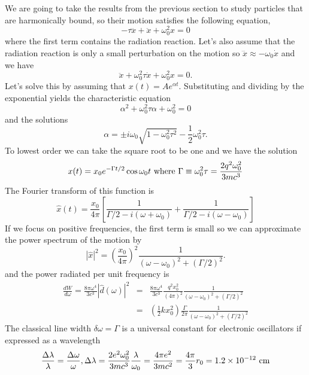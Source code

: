 We are going to take the results from the previous section to study
particles that are harmonically bound, so their motion satisfies the
following equation,
\begin{equation}
-\tau \dddot{x} + \ddot{x} + \omega_0^2 x = 0
\label{eq:245}
\end{equation}
where the first term contains the radiation reaction.  Let's also
assume that the radiation reaction is only a small perturbation on the
motion so $\dddot{x} \approx -\omega_0 \dot{x}$ and we have
\begin{equation}
\ddot{x} + \omega_0^2 \tau \dot{x} + \omega_0^2 x = 0.
\label{eq:246}
\end{equation}
Let's solve this by assuming that $x(t) = A e^{\alpha t}$.
Substituting and dividing by the exponential yields the characteristic
equation 
\begin{equation}
\alpha^2 +  \omega_0^2 \tau \alpha + \omega_0^2 = 0
\label{eq:247}
\end{equation}
and the solutions
\begin{equation}
\alpha = \pm i \omega_0 \sqrt{1 - \omega_0^2 \tau^2} - \frac{1}{2}
\omega_0^2 \tau.
\label{eq:248}
\end{equation}
To lowest order we can take the square root to be one and we have the
solution
\begin{equation}
x(t) = x_0 e^{-\Gamma t/2} \cos \omega_0 t~\hbox{\rm where}~\Gamma \equiv
\omega_0^2 \tau = \frac{2 q^2 \omega_0^2}{3mc^3}
\label{eq:249}
\end{equation}
The Fourier transform of this function is
\begin{equation}
{\hat x}(t) = \frac{x_0}{4\pi} \left [ \frac{1}{\Gamma/2 -
    i\left(\omega+\omega_0\right)} + \frac{1}{\Gamma/2 -
    i\left(\omega-\omega_0\right)} \right ]
\label{eq:250}
\end{equation}
If we focus on positive frequencies, the first term is small so we can
approximate the power spectrum of the motion by
\begin{equation}
|{\hat x}|^2 = \left ( \frac{x_0}{4\pi} \right )^2 \frac{1}{(\omega -
  \omega_0)^2 + \left(\Gamma/2\right)^2}.
\label{eq:251}
\end{equation}
and the power radiated per unit frequency is
\begin{eqnarray}
\frac{d W}{d\omega} = \frac{8 \pi \omega^4}{3 c^3}|{\hat d}(\omega)|^2
&=& \frac{8 \pi \omega^4}{3 c^3} \frac{q^2 x_0^2}{(4\pi)^2}  \frac{1}{(\omega -
  \omega_0)^2 + \left(\Gamma/2\right)^2} \\
&=& \left ( \frac{1}{2} k x_0^2 \right ) \frac{\Gamma}{2\pi}\frac{1}{(\omega -
  \omega_0)^2 + \left(\Gamma/2\right)^2}
\label{eq:252}
\end{eqnarray}
The classical line width $\delta \omega=\Gamma$ is a universal
constant for electronic oscillators if expressed as a wavelength
\begin{equation}
\frac{\Delta \lambda}{\lambda} = \frac{\Delta \omega}{\omega}, \Delta
\lambda = \frac{2e^2 \omega_0^2}{3 m c^3} \frac{\lambda}{\omega_0} =  
\frac{4 \pi e^2 }{3 m c^2} = \frac{4\pi}{3} r_0 = 1.2 \times 10^{-12}~\hbox{\rm cm}
\label{eq:253}
\end{equation}

